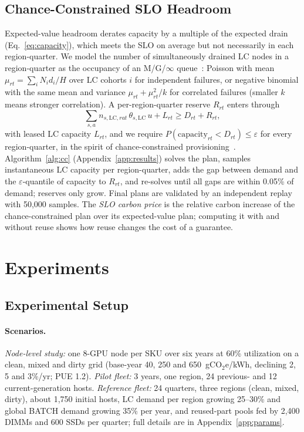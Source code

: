 \documentclass{article} %
\begin{document}
\subsection{Chance-Constrained SLO Headroom}
\label{sec:method_cc}
Expected-value headroom derates capacity by a multiple of the expected drain (Eq.~\ref{eq:capacity}), which meets the SLO on average but not necessarily in each region-quarter. We model the number of simultaneously drained LC nodes in a region-quarter as the occupancy of an M/G/$\infty$ queue~\citep{Eick1993PhysicsMtg}: Poisson with mean $\mu_{rt} = \sum_i N_i d_i / H$ over LC cohorts $i$ for independent failures, or negative binomial with the same mean and variance $\mu_{rt} + \mu_{rt}^2/k$ for correlated failures (smaller $k$ means stronger correlation). A per-region-quarter reserve $R_{rt}$ enters through
\begin{equation}
\textstyle\sum_{s,a} n_{s,\text{LC},r a t}\,\theta_{s,\text{LC}}\,u + L_{rt} \ge D_{rt} + R_{rt},
\label{eq:reserve}
\end{equation}
with leased LC capacity $L_{rt}$, and we require $P(\text{capacity}_{rt} < D_{rt}) \le \varepsilon$ for every region-quarter, in the spirit of chance-constrained provisioning~\citep{Cohen2017OvercommitmentCloud}. Algorithm~\ref{alg:cc} (Appendix~\ref{app:results}) solves the plan, samples instantaneous LC capacity per region-quarter, adds the gap between demand and the $\varepsilon$-quantile of capacity to $R_{rt}$, and re-solves until all gaps are within 0.05\% of demand; reserves only grow. Final plans are validated by an independent replay with 50,000 samples. The \emph{SLO carbon price} is the relative carbon increase of the chance-constrained plan over its expected-value plan; computing it with and without reuse shows how reuse changes the cost of a guarantee.


\section{Experiments}
\label{sec:experiments}
\subsection{Experimental Setup}
\label{sec:setup}
\paragraph{Scenarios.} \emph{Node-level study:} one 8-GPU node per SKU over six years at 60\% utilization on a clean, mixed and dirty grid (base-year 40, 250 and 650~gCO$_2$e/kWh, declining 2, 5 and 3\%/yr; PUE 1.2). \emph{Pilot fleet:} 3 years, one region, 24 previous- and 12 current-generation hosts. \emph{Reference fleet:} 24 quarters, three regions (clean, mixed, dirty), about 1,750 initial hosts, LC demand per region growing 25--30\% and global BATCH demand growing 35\% per year, and reused-part pools fed by 2,400 DIMMs and 600 SSDs per quarter; full details are in Appendix~\ref{app:params}.
\end{document}
